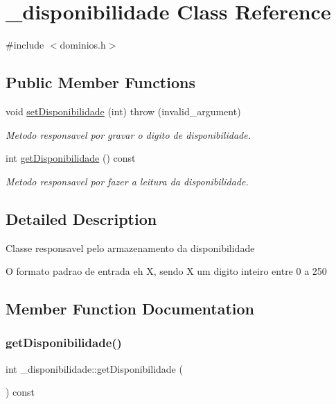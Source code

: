 \hypertarget{class__disponibilidade}{}\section{\+\_\+disponibilidade Class Reference}
\label{class__disponibilidade}


{\ttfamily \#include $<$dominios.\+h$>$}

\subsection*{Public Member Functions}
\begin{DoxyCompactItemize}
\item 
void \mbox{\hyperlink{class__disponibilidade_ab56b496547b580ec59855c80bd630bbf}{set\+Disponibilidade}} (int)  throw (invalid\+\_\+argument)
\begin{DoxyCompactList}\small\item\em Metodo responsavel por gravar o digito de disponibilidade. \end{DoxyCompactList}\item 
int \mbox{\hyperlink{class__disponibilidade_af5b8e399e71b771998c7a0d3c4c39446}{get\+Disponibilidade}} () const
\begin{DoxyCompactList}\small\item\em Metodo responsavel por fazer a leitura da disponibilidade. \end{DoxyCompactList}\end{DoxyCompactItemize}


\subsection{Detailed Description}
Classe responsavel pelo armazenamento da disponibilidade

O formato padrao de entrada eh X, sendo X um digito inteiro entre 0 a 250 

\subsection{Member Function Documentation}
\mbox{\label{class__disponibilidade_af5b8e399e71b771998c7a0d3c4c39446}} 
\subsubsection{\texorpdfstring{getDisponibilidade()}{getDisponibilidade()}}
{\footnotesize\ttfamily int \+\_\+disponibilidade\+::get\+Disponibilidade (\begin{DoxyParamCaption}{ }\end{DoxyParamCaption}) const\hspace{0.3cm}{\ttfamily [inline]}}



